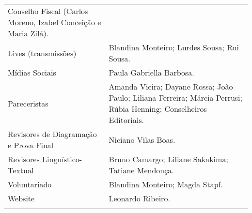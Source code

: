 \documentclass[
]{article}
\begin{document}
\begin{longtable}[]{@{}
  >{\raggedright\arraybackslash}p{}
  >{\raggedright\arraybackslash}p{}@{}}
\begin{minipage}[b]{\linewidth}
Conselho Fiscal (Carlos Moreno, Izabel Conceição e Maria Zilá).
\end{minipage} \\
\begin{minipage}[b]{\linewidth}\raggedright
Lives (transmissões)
\end{minipage} & \begin{minipage}[b]{\linewidth}\raggedright
Blandina Monteiro; Lurdes Sousa; Rui Sousa.
\end{minipage} \\
\begin{minipage}[b]{\linewidth}\raggedright
Mídias Sociais
\end{minipage} & \begin{minipage}[b]{\linewidth}\raggedright
Paula Gabriella Barbosa.
\end{minipage} \\
\begin{minipage}[b]{\linewidth}\raggedright
Pareceristas
\end{minipage} & \begin{minipage}[b]{\linewidth}\raggedright
Amanda Vieira; Dayane Rossa; João Paulo; Liliana Ferreira; Márcia Perrusi; Rúbia Henning; Conselheiros Editoriais.
\end{minipage} \\
\begin{minipage}[b]{\linewidth}\raggedright
Revisores de Diagramação e Prova Final
\end{minipage} & \begin{minipage}[b]{\linewidth}\raggedright
Niciano Vilas Boas.
\end{minipage} \\
\begin{minipage}[b]{\linewidth}\raggedright
Revisores Linguístico-Textual
\end{minipage} & \begin{minipage}[b]{\linewidth}\raggedright
Bruno Camargo; Liliane Sakakima; Tatiane Mendonça.
\end{minipage} \\
\begin{minipage}[b]{\linewidth}\raggedright
Voluntariado
\end{minipage} & \begin{minipage}[b]{\linewidth}\raggedright
Blandina Monteiro; Magda Stapf.
\end{minipage} \\
\begin{minipage}[b]{\linewidth}\raggedright
Website
\end{minipage} & \begin{minipage}[b]{\linewidth}\raggedright
Leonardo Ribeiro.
\end{minipage} \\
\midrule\noalign{}
\endhead
\bottomrule\noalign{}
\endlastfoot
\end{longtable}
\end{document}
